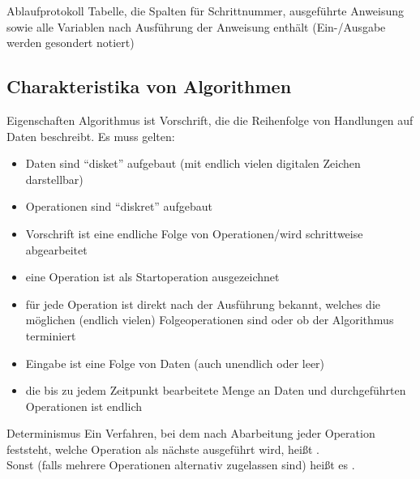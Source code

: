 \begin{Def}{Ablaufprotokoll}
    Tabelle, die Spalten für Schrittnummer, ausgeführte Anweisung sowie
    alle Variablen nach Ausführung der Anweisung enthält (Ein-/Ausgabe werden
    gesondert notiert)
\end{Def}

\subsection{%
    Charakteristika von Algorithmen%
}

\begin{Def}{Eigenschaften}
    Algorithmus ist Vorschrift, die die Reihenfolge von Handlungen auf Daten
    beschreibt. Es muss gelten:
    \begin{itemize}
        \item Daten sind "`disket"' aufgebaut (mit endlich vielen
        digitalen Zeichen darstellbar)

        \item Operationen sind "`diskret"' aufgebaut

        \item Vorschrift ist eine endliche Folge von Operationen/wird
        schrittweise abgearbeitet

        \item eine Operation ist als Startoperation ausgezeichnet

        \item für jede Operation ist direkt nach der Ausführung bekannt,
        welches die möglichen (endlich vielen) Folgeoperationen sind oder ob
        der Algorithmus terminiert

        \item Eingabe ist eine Folge von Daten (auch unendlich oder leer)

        \item die bis zu jedem Zeitpunkt bearbeitete Menge an Daten
        und durchgeführten Operationen ist endlich
    \end{itemize}
\end{Def}

\begin{Def}{Determinismus}
    Ein Verfahren, bei dem nach Abarbeitung jeder Operation feststeht, welche
    Operation als nächste ausgeführt wird, heißt . \\
    Sonst (falls mehrere Operationen alternativ zugelassen sind) heißt es
    .
\end{Def}

